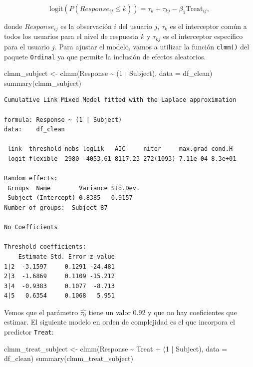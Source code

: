 \documentclass[
  12pt,
  a4paper,
  extrafontsizes,
  onecolumn,
  openright]{memoir}
\newenvironment{Shaded}{\begin{snugshade}}{\end{snugshade}}
\newcommand{\AttributeTok}[1]{\textcolor[rgb]{0.40,0.45,0.13}{#1}}
\newcommand{\DecValTok}[1]{\textcolor[rgb]{0.68,0.00,0.00}{#1}}
\newcommand{\FunctionTok}[1]{\textcolor[rgb]{0.28,0.35,0.67}{#1}}
\newcommand{\NormalTok}[1]{\textcolor[rgb]{0.00,0.23,0.31}{#1}}
\newcommand{\OtherTok}[1]{\textcolor[rgb]{0.00,0.23,0.31}{#1}}
\newcommand{\SpecialCharTok}[1]{\textcolor[rgb]{0.37,0.37,0.37}{#1}}
\begin{document}
\[
\text{logit}(P(Response_{ij} \leq k)) = \tau_k +\tau_{kj} - \beta_1 \text{Treat}_{ij},
\]

donde \(Response_{ij}\) es la observación \(i\) del usuario \(j\),
\(\tau_k\) es el interceptor común a todos los usuarios para el nivel de
respuesta \(k\) y \(\tau_{kj}\) es el interceptor específico para el
usuario \(j\). Para ajustar el modelo, vamos a utilizar la función
\texttt{clmm()} del paquete \texttt{Ordinal} ya que permite la inclusión
de efectos aleatorios.

\scriptsize

\begin{Shaded}
\begin{Highlighting}[]
\NormalTok{clmm\_subject }\OtherTok{\textless{}{-}} \FunctionTok{clmm}\NormalTok{(Response }\SpecialCharTok{\textasciitilde{}}\NormalTok{ (}\DecValTok{1} \SpecialCharTok{|}\NormalTok{ Subject), }\AttributeTok{data =}\NormalTok{ df\_clean)}
\FunctionTok{summary}\NormalTok{(clmm\_subject)}
\end{Highlighting}
\end{Shaded}

\begin{verbatim}
Cumulative Link Mixed Model fitted with the Laplace approximation

formula: Response ~ (1 | Subject)
data:    df_clean

 link  threshold nobs logLik   AIC     niter     max.grad cond.H 
 logit flexible  2980 -4053.61 8117.23 272(1093) 7.11e-04 8.3e+01

Random effects:
 Groups  Name        Variance Std.Dev.
 Subject (Intercept) 0.8385   0.9157  
Number of groups:  Subject 87 

No Coefficients

Threshold coefficients:
    Estimate Std. Error z value
1|2  -3.1597     0.1291 -24.481
2|3  -1.6869     0.1109 -15.212
3|4  -0.9383     0.1077  -8.713
4|5   0.6354     0.1068   5.951
\end{verbatim}

\normalsize

Vemos que el parámetro \(\widehat{\tau_0}\) tiene un valor 0.92 y que no
hay coeficientes que estimar. El siguiente modelo en orden de
complejidad es el que incorpora el predictor \texttt{Treat}:

\scriptsize

\begin{Shaded}
\begin{Highlighting}[]
\NormalTok{clmm\_treat\_subject }\OtherTok{\textless{}{-}} \FunctionTok{clmm}\NormalTok{(Response }\SpecialCharTok{\textasciitilde{}}\NormalTok{ Treat }\SpecialCharTok{+}\NormalTok{ (}\DecValTok{1} \SpecialCharTok{|}\NormalTok{ Subject), }\AttributeTok{data =}\NormalTok{ df\_clean)}
\FunctionTok{summary}\NormalTok{(clmm\_treat\_subject)}
\end{Highlighting}
\end{Shaded}
\end{document}
